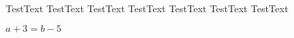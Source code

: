\documentclass[11pt]{article}
\begin{document}
    \begin{center}
        TestText TestText TestText TestText TestText TestText TestText
    \end{center}

    $a + 3 = b - 5$
\end{document}
